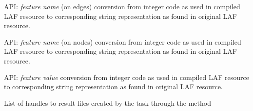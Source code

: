 \documentclass[letterpaper,10pt,english]{sphinxmanual}
\begin{document}
\begin{fulllineitems}
\begin{fulllineitems}
\begin{quote}
\begin{description}
\begin{itemize}
\end{itemize}

\end{description}\end{quote}

\end{fulllineitems}


\begin{fulllineitems}
\label{graf/graf:graf.task.GrafTask.rep_fname_edge}
API: \emph{feature name} (on edges) conversion from integer code as used in compiled LAF resource
to corresponding string representation as found in original LAF resource.

\end{fulllineitems}


\begin{fulllineitems}
\label{graf/graf:graf.task.GrafTask.rep_fname_node}
API: \emph{feature name} (on nodes) conversion from integer code as used in compiled LAF resource
to corresponding string representation as found in original LAF resource.

\end{fulllineitems}


\begin{fulllineitems}
\label{graf/graf:graf.task.GrafTask.rep_fval}
API: \emph{feature value} conversion from integer code as used in compiled LAF resource
to corresponding string representation as found in original LAF resource.

\end{fulllineitems}


\begin{fulllineitems}
\label{graf/graf:graf.task.GrafTask.result_files}
List of handles to result files created by the task through the method {\hyperref[graf/graf:graf.task.GrafTask.add_result]{}}

\end{fulllineitems}


\end{fulllineitems}
\end{document}
